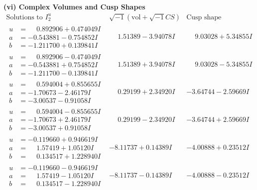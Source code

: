 \documentclass[1p]{elsarticle_modified}
\theoremstyle{definition}
\newcommand{\I}{\sqrt{-1}}
\begin{document}
\newpage\flushleft \textbf{(vi) Complex Volumes and Cusp Shapes}
$$\begin{array}{c|c|c}  
\text{Solutions to }I^u_{2}& \I (\text{vol} + \sqrt{-1}CS) & \text{Cusp shape}\\
 \hline 
\begin{aligned}
u &= \phantom{-}0.892906 + 0.474049 I \\
a &= -0.543881 - 0.754852 I \\
b &= -1.211700 + 0.139841 I\end{aligned}
 & \phantom{-}1.51389 - 3.94078 I & \phantom{-}9.03028 + 5.34855 I \\ \hline\begin{aligned}
u &= \phantom{-}0.892906 - 0.474049 I \\
a &= -0.543881 + 0.754852 I \\
b &= -1.211700 - 0.139841 I\end{aligned}
 & \phantom{-}1.51389 + 3.94078 I & \phantom{-}9.03028 - 5.34855 I \\ \hline\begin{aligned}
u &= \phantom{-}0.594004 + 0.855655 I \\
a &= -1.70673 - 2.46179 I \\
b &= -3.00537 - 0.91058 I\end{aligned}
 & \phantom{-}0.29199 + 2.34920 I & -3.64744 - 2.59669 I \\ \hline\begin{aligned}
u &= \phantom{-}0.594004 - 0.855655 I \\
a &= -1.70673 + 2.46179 I \\
b &= -3.00537 + 0.91058 I\end{aligned}
 & \phantom{-}0.29199 - 2.34920 I & -3.64744 + 2.59669 I \\ \hline\begin{aligned}
u &= -0.119660 + 0.946619 I \\
a &= \phantom{-}1.57419 + 1.05120 I \\
b &= \phantom{-}0.134517 + 1.228940 I\end{aligned}
 & -8.11737 + 0.14389 I & -4.00888 + 0.23512 I \\ \hline\begin{aligned}
u &= -0.119660 - 0.946619 I \\
a &= \phantom{-}1.57419 - 1.05120 I \\
b &= \phantom{-}0.134517 - 1.228940 I\end{aligned}
 & -8.11737 - 0.14389 I & -4.00888 - 0.23512 I \\ \hline\begin{aligned}

\end{aligned}
\end{array}$$
\end{document}
